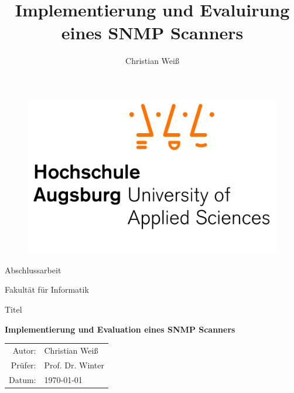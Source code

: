\documentclass[11pt,a4paper]{article}
\author{Christian Weiß}
\title{Implementierung und Evaluirung eines SNMP Scanners}
\begin{document}
\begin{figure}	%
	\centering
	\includegraphics[scale=.7]{Bilder/hsa.jpg}
	\label{img:logo}
\end{figure}
	
\vspace{\fill}

\begin{center}
	
	\begin{Huge}
		Abschlussarbeit\linebreak
	\end{Huge}
	
	\vspace{\fill}
	
	\begin{Large}
		Fakultät für Informatik\linebreak
	\end{Large}
	
	\vspace{\fill}
	
	\begin{LARGE}
		Titel\linebreak
	\end{LARGE}
	
	\vspace{1cm}
	
	\begin{Huge}
		\textbf{Implementierung und Evaluation eines SNMP Scanners}\linebreak
	\end{Huge}
	
	\vspace{\fill}
	
	\begin{Large}
		\begin{tabular}{r l}
			Autor: & Christian Weiß \\
			Prüfer: & Prof. Dr. Winter \\
			Datum: & \today \\
		\end{tabular}
	\end{Large}
	
\end{center}	%
\pagebreak
\end{document}
